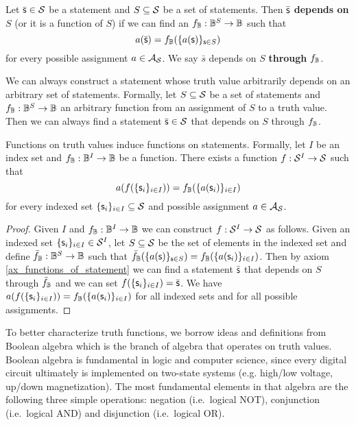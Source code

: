 \documentclass[11pt,letterpaper,fleqn]{memoir} %
\begin{document}
\begin{mathSection}
	\begin{defn}\label{def_dependence}
	Let $\bar{\mathsf{s}} \in \mathcal{S}$ be a statement and $S \subseteq \mathcal{S}$ be a set of statements. Then $\bar{\mathsf{s}}$ \textbf{depends on} $S$ (or it is a function of $S$)  if we can find an $f_{\mathbb{B}} : \mathbb{B}^S \to \mathbb{B}$ such that
	$$a(\bar{\mathsf{s}}) = f_{\mathbb{B}} (\{a(\mathsf{s})\}_{\mathsf{s} \in S})$$
	for every possible assignment $a \in \mathcal{A}_{\mathcal{S}}$. We say $\bar{s}$ depends on $S$ \textbf{through} $f_{\mathbb{B}}$.
\end{defn}

	\begin{axiom}\label{ax_functions_of_statement}
		We can always construct a statement whose truth value arbitrarily depends on an arbitrary set of statements. Formally, let $S \subseteq \mathcal{S}$ be a set of statements and $f_{\mathbb{B}} : \mathbb{B}^S \to \mathbb{B}$ an arbitrary function from an assignment of $S$ to a truth value. Then we can always find a statement $\bar{\mathsf{s}} \in \mathcal{S}$ that depends on $S$ through $f_{\mathbb{B}}$.
	\end{axiom}
\begin{coro}
	Functions on truth values induce functions on statements. Formally, let $I$ be an index set and $f_{\mathbb{B}} : \mathbb{B}^I \to \mathbb{B}$ be a function. There exists a function $f : \mathcal{S}^I \to \mathcal{S}$ such that
	$$a(f(\{\mathsf{s}_i\}_{i \in I})) = f_{\mathbb{B}}(\{a(\mathsf{s}_i)\}_{i \in I})$$
	for every indexed set $\{\mathsf{s}_i\}_{i \in I} \subseteq \mathcal{S}$ and possible assignment $a \in \mathcal{A}_{\mathcal{S}}$.
\end{coro}
\begin{proof}
	Given $I$ and $f_{\mathbb{B}} : \mathbb{B}^I \to \mathbb{B}$ we can construct $f : \mathcal{S}^I \to \mathcal{S}$ as follows. Given an indexed set $\{\mathsf{s}_i\}_{i \in I} \in \mathcal{S}^I$, let $S \subseteq \mathcal{S}$ be the set of elements in the indexed set and define $\bar{f}_{\mathbb{B}} : \mathbb{B}^S \to \mathbb{B}$ such that $\bar{f}_{\mathbb{B}}(\{a(\mathsf{s})\}_{\mathsf{s} \in S}) = f_{\mathbb{B}}(\{a(\mathsf{s}_i)\}_{i \in I})$. Then by axiom \ref{ax_functions_of_statement} we can find a statement $\bar{\mathsf{s}}$ that depends on $S$ through $\bar{f}_{\mathbb{B}}$ and we can set $f(\{\mathsf{s}_i\}_{i \in I}) = \bar{\mathsf{s}}$. We have $a(f(\{\mathsf{s}_i\}_{i \in I})) = f_{\mathbb{B}}(\{a(\mathsf{s}_i)\}_{i \in I})$ for all indexed sets and for all possible assignments.
\end{proof}
\end{mathSection}

To better characterize truth functions, we borrow ideas and definitions from Boolean algebra which is the branch of algebra that operates on truth values. Boolean algebra is fundamental in logic and computer science, since every digital circuit ultimately is implemented on two-state systems (e.g. high/low voltage, up/down magnetization).  The most fundamental elements in that algebra are the following three simple operations: negation (i.e.~logical NOT), conjunction (i.e.~logical AND) and disjunction (i.e.~logical OR).
\end{document}
